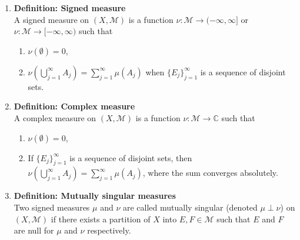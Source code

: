 \documentclass{article}
\begin{document}
\begin{enumerate}
  \item \textbf{Definition: Signed measure}\\
    A signed measure on $(X, \mathcal M)$ is a function
    $\nu\colon \mathcal M \rightarrow (-\infty, \infty]$ or
    $\nu\colon \mathcal M \rightarrow [-\infty, \infty)$ such that \begin{enumerate}
      \item $\nu(\emptyset) = 0$,
      \item $\nu\mathopen{}\left(\bigcup_{j=1}^\infty A_j\mathclose{}\right) = \sum_{j=1}^\infty \mu(A_j)$
      when $\{E_j\}_{j=1}^\infty$ is a sequence of disjoint sets.
    \end{enumerate}

  \item \textbf{Definition: Complex measure}\\
    A complex measure on $(X, \mathcal M)$ is a function
    $\nu\colon \mathcal M \rightarrow \mathbb C$ such that \begin{enumerate}
      \item $\nu(\emptyset) = 0$,
      \item If $\{E_j\}_{j=1}^\infty$ is a sequence of disjoint sets, then
      $\nu\mathopen{}\left(\bigcup_{j=1}^\infty A_j\mathclose{}\right) = \sum_{j=1}^\infty \mu(A_j)$,
      where the sum converges absolutely.
    \end{enumerate}

  \item \textbf{Definition: Mutually singular measures}\\
    Two signed measures $\mu$ and $\nu$ are called mutually singular
    (denoted $\mu \perp \nu$) on $(X, \mathcal M)$ if there exists a partition
    of $X$ into $E, F \in \mathcal M$ such that $E$ and $F$ are null for $\mu$
    and $\nu$ respectively.


\end{enumerate}
\end{document}
